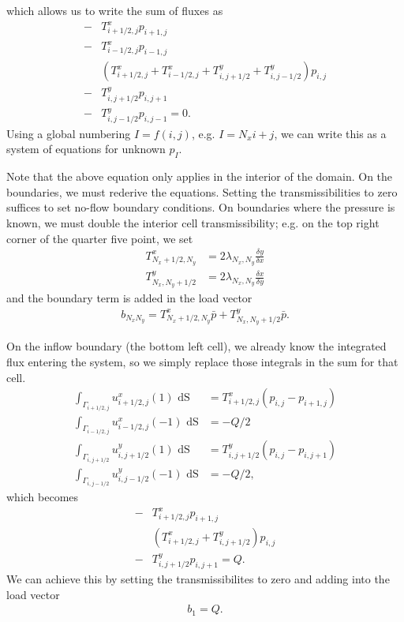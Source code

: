 \documentclass{article}
\begin{document}
which allows us to write the sum of fluxes as
\begin{align*}
    - & T^x_{i+1/2,j} p_{i+1,j} \\
    - & T^x_{i-1/2,j} p_{i-1,j} \\
      & (T^x_{i+1/2,j} + T^x_{i-1/2,j} + T^y_{i,j+1/2} + T^y_{i,j-1/2}) p_{i,j} \\
    - & T^y_{i,j+1/2} p_{i,j+1} \\
    - & T^y_{i,j-1/2} p_{i,j-1} = 0.
\end{align*}
Using a global numbering $I = f(i,j)$, e.g. $I = N_x i + j$, we can write this as a system of equations for unknown $p_I$.

Note that the above equation only applies in the interior of the domain. On the boundaries, we must rederive the equations.
Setting the transmissibilities to zero suffices to set no-flow boundary conditions.
On boundaries where the pressure is known, we must double the interior cell transmissibility; e.g. on the top right corner of the quarter five point, we set
\begin{align}
    T^x_{N_x+1/2, N_y} &= 2 \lambda_{N_x,N_y} \frac{\delta y}{\delta x} \\
    T^y_{N_x, N_y+1/2} &= 2 \lambda_{N_x,N_y} \frac{\delta x}{\delta y}
\end{align}
and the boundary term is added in the load vector
\begin{align}
b_{N_x N_y} = T^x_{N_x+1/2, N_y} \bar{p} + T^y_{N_x, N_y+1/2} \bar{p}.
\end{align}

On the inflow boundary (the bottom left cell), we already know the integrated flux entering the system, so we simply replace those integrals in the sum for that cell.
\begin{align}
    \int_{\Gamma_{i+1/2,j}} u^x_{i+1/2,j} (1) \text{ dS} &= T^x_{i+1/2,j} (p_{i,j} - p_{i+1,j})\\
    \int_{\Gamma_{i-1/2,j}} u^x_{i-1/2,j} (-1) \text{ dS} &= -Q/2\\
    \int_{\Gamma_{i,j+1/2}} u^y_{i,j+1/2} (1) \text{ dS} &= T^y_{i,j+1/2} (p_{i,j} - p_{i,j+1})\\
    \int_{\Gamma_{i,j-1/2}} u^y_{i,j-1/2} (-1) \text{ dS} &= -Q/2,
\end{align}
which becomes
\begin{align*}
    - & T^x_{i+1/2,j} p_{i+1,j} \\
      & (T^x_{i+1/2,j} + T^y_{i,j+1/2}) p_{i,j} \\
    - & T^y_{i,j+1/2} p_{i,j+1} = Q.
\end{align*}
We can achieve this by setting the transmissibilites to zero and adding into the load vector
\begin{align}
    b_1 = Q.
\end{align}
\end{document}
